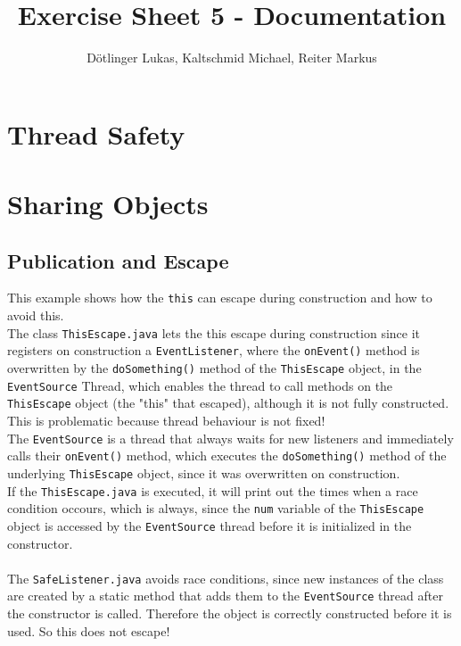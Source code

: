 \documentclass{article}
\begin{document}
	\title{Exercise Sheet 5 - Documentation}
	\date{}
	\author{Dötlinger Lukas, Kaltschmid Michael, Reiter Markus}

	\maketitle

  \section{Thread Safety}
  
  \section{Sharing Objects}
  
    \subsection{Publication and Escape}
    
    This example shows how the \texttt{this} can escape during construction and how to avoid this.\\
    The class \texttt{ThisEscape.java} lets the this escape during construction since it registers on construction a \texttt{EventListener}, where the \texttt{onEvent()} method is overwritten by the \texttt{doSomething()} method of the \texttt{ThisEscape} object, in the \texttt{EventSource} Thread, which enables the thread to call methods on the \texttt{ThisEscape} object (the "this" that escaped), although it is not fully constructed. This is problematic because thread behaviour is not fixed!\\
    The \texttt{EventSource} is a thread that always waits for new listeners and immediately calls their \texttt{onEvent()} method, which executes the \texttt{doSomething()} method of the underlying \texttt{ThisEscape} object, since it was overwritten on construction.\\ 
    If the \texttt{ThisEscape.java} is executed, it will print out the times when a race condition occours, which is always, since the \texttt{num} variable of the \texttt{ThisEscape} object is accessed by the \texttt{EventSource} thread before it is initialized in the constructor.\\
    \\
    The \texttt{SafeListener.java} avoids race conditions, since new instances of the class are created by a static method that adds them to the \texttt{EventSource} thread after the constructor is called. Therefore the object is correctly constructed before it is used. So this does not escape!\\

  
\end{document}
